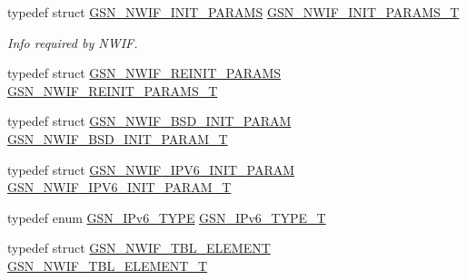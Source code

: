 \begin{DoxyCompactItemize}
\item 
typedef struct \hyperlink{a00169}{GSN\_\-NWIF\_\-INIT\_\-PARAMS} \hyperlink{a00670_gaa7bcca8daa18d56c6d5f107fc3523370}{GSN\_\-NWIF\_\-INIT\_\-PARAMS\_\-T}
\begin{DoxyCompactList}\small\item\em Info required by NWIF. \end{DoxyCompactList}\item 
typedef struct \hyperlink{a00175}{GSN\_\-NWIF\_\-REINIT\_\-PARAMS} \hyperlink{a00534_abe5b22bf98ced0df6c6eb1abfc0230c1}{GSN\_\-NWIF\_\-REINIT\_\-PARAMS\_\-T}
\item 
typedef struct \hyperlink{a00166}{GSN\_\-NWIF\_\-BSD\_\-INIT\_\-PARAM} \hyperlink{a00534_a715283228c86aaa90a9329f01dec6287}{GSN\_\-NWIF\_\-BSD\_\-INIT\_\-PARAM\_\-T}
\item 
typedef struct \hyperlink{a00174}{GSN\_\-NWIF\_\-IPV6\_\-INIT\_\-PARAM} \hyperlink{a00534_a231c2639d51844e6d75b4916c813f293}{GSN\_\-NWIF\_\-IPV6\_\-INIT\_\-PARAM\_\-T}
\item 
typedef enum \hyperlink{a00534_a00c060a93ce3ad909cef83066fef046b}{GSN\_\-IPv6\_\-TYPE} \hyperlink{a00534_aac8a8005b7e88e230928699f1b2cc0d2}{GSN\_\-IPv6\_\-TYPE\_\-T}
\item 
typedef struct \hyperlink{a00177}{GSN\_\-NWIF\_\-TBL\_\-ELEMENT} \hyperlink{a00534_a8a45953bae7352132d28cdd008cf0968}{GSN\_\-NWIF\_\-TBL\_\-ELEMENT\_\-T}
\end{DoxyCompactItemize}
